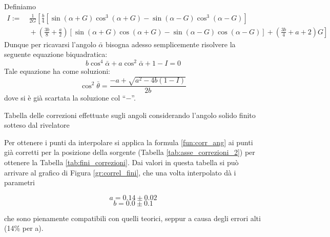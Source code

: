 Definiamo
\begin{equation}
\begin{split}
	I := &\ \frac{1}{2G} \left[ \frac{b}{4}\left[ \sin \left( \alpha + G \right) \cos^3 \left( \alpha + G \right) - \sin \left( \alpha - G \right) \cos^3 \left( \alpha - G \right) \right] \right.\\
	&\left.\ + \left( \frac{3b}{8} + \frac{a}{2} \right)\left[ \sin \left( \alpha + G \right) \cos \left( \alpha + G \right) - \sin \left( \alpha - G \right) \cos \left( \alpha - G \right) \right] + \left( \frac{3b}{4} + a + 2 \right) G \right]
\end{split}
\end{equation}
Dunque per ricavarsi l'angolo $ \bar \alpha $ bisogna adesso semplicemente risolvere la seguente equazione biquadratica: 
\begin{equation}
	b \cos^4 \bar\alpha + a \cos ^ 2 \bar \alpha + 1 - I= 0
\end{equation}
Tale equazione ha come soluzioni:
\begin{equation}
	\cos^2 \bar \theta  = \frac{-a + \sqrt{a^2 - 4b(1 - I)}}{2b}
	\label{fun:corr_ang}
\end{equation}
dove si è già scartata la soluzione col ``$-$''.

\begin{table}[h]
	\centering
	
	\caption{Tabella delle correzioni effettuate sugli angoli considerando l'angolo solido finito sotteso dal rivelatore}
	\label{tab:fini_correzioni}
\end{table}

Per ottenere i punti da interpolare si applica la formula \ref{fun:corr_ang} ai punti già corretti per la posizione della sorgente (Tabella \ref{tab:asse_correzioni_2}) per ottenere la Tabella \ref{tab:fini_correzioni}. Dai valori in questa tabella si può arrivare al grafico di Figura \ref{gr:correl_fini}, che una volta interpolato dà i parametri

$$a=0.14 \pm 0.02$$
$$b=0.0 \pm 0.1$$

che sono pienamente compatibili con quelli teorici, seppur a causa degli errori alti (14\% per a).





